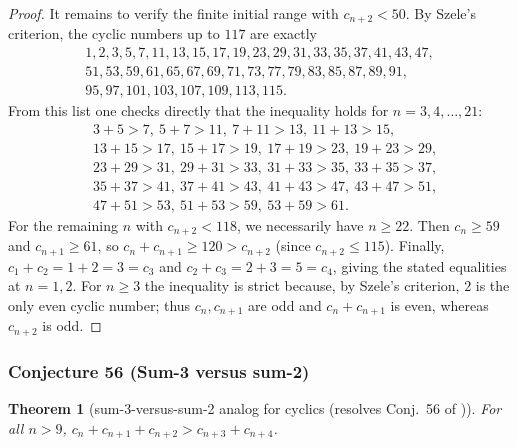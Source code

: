 \documentclass[12pt]{article}
\newtheorem{theorem}{Theorem}
\theoremstyle{remark}
\begin{document}
\begin{proof}
It remains to verify the finite initial range with $c_{n+2}<50$. By Szele's criterion, the cyclic numbers up to $117$ are exactly
\[
\begin{gathered}
1,2,3,5,7,11,13,15,17,19,23,29,31,33,35,37,41,43,47,\\
51,53,59,61,65,67,69,71,73,77,79,83,85,87,89,91,\\
95,97,101,103,107,109,113,115.
\end{gathered}
\]
From this list one checks directly that the inequality holds for $n=3,4,\dots,21$:
\[
\begin{aligned}
&3+5>7,\ 5+7>11,\ 7+11>13,\ 11+13>15,\\
&13+15>17,\ 15+17>19,\ 17+19>23,\ 19+23>29,\\
&23+29>31,\ 29+31>33,\ 31+33>35,\ 33+35>37,\\
&35+37>41,\ 37+41>43,\ 41+43>47,\ 43+47>51,\\
&47+51>53,\ 51+53>59,\ 53+59>61.
\end{aligned}
\]
For the remaining $n$ with $c_{n+2}<118$, we necessarily have $n\ge22$. Then $c_n\ge59$ and $c_{n+1}\ge61$, so $c_n+c_{n+1}\ge120>c_{n+2}$ (since $c_{n+2}\le115$). Finally, $c_1+c_2=1+2=3=c_3$ and $c_2+c_3=2+3=5=c_4$, giving the stated equalities at $n=1,2$. For $n\ge3$ the inequality is strict because, by Szele's criterion, $2$ is the only even cyclic number; thus $c_n,c_{n+1}$ are odd and $c_n+c_{n+1}$ is even, whereas $c_{n+2}$ is odd.
\end{proof}


\subsubsection{Conjecture 56 (Sum-3 versus sum-2)}
\begin{theorem}[sum-3-versus-sum-2 analog for cyclics (resolves Conj.~56 of \cite{Cohen2025})]\label{thm:sum_3_versus_sum_2_cyclics}
For all $n>9$, $c_n+c_{n+1}+c_{n+2}>c_{n+3}+c_{n+4}$.
\end{theorem}
\end{document}
